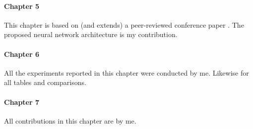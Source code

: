 \paragraph{Chapter 5}
This chapter is based on (and extends) a peer-reviewed
conference paper \parencite{napoleslopez2021augmentednet}.
The proposed neural network architecture is my contribution.

\paragraph{Chapter 6}
All the experiments reported in this chapter were conducted
by me. Likewise for all tables and comparisons.

\paragraph{Chapter 7}
All contributions in this chapter are by me.
